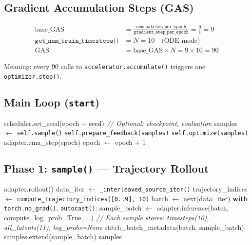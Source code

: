 \documentclass[11pt]{article}
\begin{document}
\subsection{Gradient Accumulation Steps (GAS)}

\begin{align}
\text{base\_GAS} &= \frac{\texttt{num\_batches\_per\_epoch}}{\texttt{gradient\_step\_per\_epoch}} = \frac{9}{1} = 9 \\[6pt]
\texttt{get\_num\_train\_timesteps()} &= N = 10 \quad \text{(ODE mode)} \\[6pt]
\text{GAS} &= \text{base\_GAS} \times N = 9 \times 10 = 90
\end{align}

Meaning: every 90 calls to \texttt{accelerator.accumulate()} triggers one \texttt{optimizer.step()}.

\subsection{Main Loop (\texttt{start})}

\begin{algorithm}[H]
\caption{OPDTrainer.start()}
\begin{algorithmic}
    \STATE scheduler.set\_seed(epoch + seed)
    \STATE \textit{// Optional: checkpoint, evaluation}
    \STATE samples $\leftarrow$ \texttt{self.sample()} 
    \STATE \texttt{self.prepare\_feedback(samples)} 
    \STATE \texttt{self.optimize(samples)} 
    \STATE adapter.ema\_step(epoch)
    \STATE epoch $\leftarrow$ epoch + 1
\ENDWHILE
\end{algorithmic}
\end{algorithm}

\subsection{Phase 1: \texttt{sample()} --- Trajectory Rollout}

\begin{algorithm}[H]
\caption{OPD sample() --- ODE mode}
\begin{algorithmic}
\STATE adapter.rollout() 
\STATE data\_iter $\leftarrow$ \texttt{\_interleaved\_source\_iter()} 
\STATE trajectory\_indices $\leftarrow$ \texttt{compute\_trajectory\_indices([0..9], 10)}
    \STATE batch $\leftarrow$ next(data\_iter) 
    \STATE \textbf{with} \texttt{torch.no\_grad()}, \texttt{autocast()}:
    \STATE \quad sample\_batch $\leftarrow$ adapter.inference(batch, compute\_log\_prob=True, ...)
    \STATE \quad \textit{// Each sample stores: timesteps(10), all\_latents(11), log\_probs=None}
    \STATE \quad stitch\_batch\_metadata(batch, sample\_batch) 
    \STATE \quad samples.extend(sample\_batch)
\ENDFOR
\RETURN samples 
\end{algorithmic}
\end{algorithm}
\end{document}
